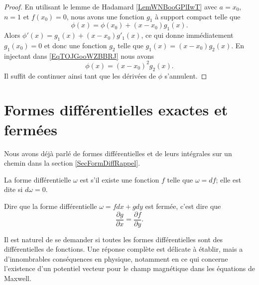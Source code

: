 \begin{proof}
    En utilisant le lemme de Hadamard \ref{LemWNBooGPlIwT} avec \( a=x_0\), \( n=1\) et \( f(x_0)=0\), nous avons une fonction \( g_1\) à support compact telle que
    \begin{equation}        \label{EqTOJGooWZBBRJ}
        \phi(x)=\phi(x_0)+(x-x_0)g_1(x).
    \end{equation}
    Alors \( \phi'(x)=g_1(x)+(x-x_0)g'_1(x)\), ce qui donne immédiatement \( g_1(x_0)=0\) et donc une fonction \( g_2\) telle que \( g_1(x)=(x-x_0)g_2(x)\). En injectant dans \eqref{EqTOJGooWZBBRJ} nous avons
    \begin{equation}
        \phi(x)=(x-x_0)^2g_2(x).
    \end{equation}
    Il suffit de continuer ainsi tant que les dérivées de \( \phi\) s'annulent.
\end{proof}

\section{Formes différentielles exactes et fermées}

Nous avons déjà parlé de formes différentielles et de leurs intégrales sur un chemin dans la section \ref{SecFormDiffRappel}.

\begin{definition}  \label{DefEFKQmPs}
La forme différentielle $\omega$ est  s'il existe une fonction $f$ telle que $\omega=df$; elle est dite  si $d\omega=0$.
\end{definition}

Dire que la forme différentielle $\omega=fdx+gdy$ est fermée, c'est dire que
\begin{equation}
    \frac{ \partial g }{ \partial x }=\frac{ \partial f }{ \partial y }.
\end{equation}

Il est naturel de se demander si toutes les formes différentielles sont des différentielles de fonctions. Une réponse complète est délicate à établir, mais a d'innombrables conséquences en physique, notamment en ce qui concerne l'existence d'un potentiel vecteur pour le champ magnétique dans les équations de Maxwell.

